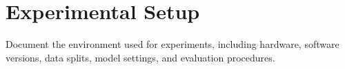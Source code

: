 \section{Experimental Setup}
\label{sec:experimental-setup}

Document the environment used for experiments, including hardware, software
versions, data splits, model settings, and evaluation procedures.
